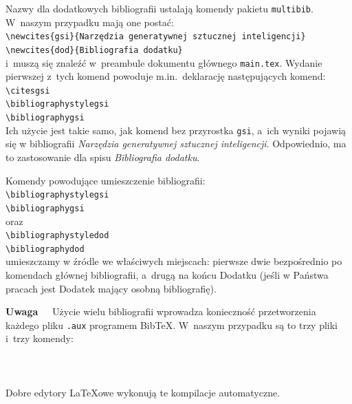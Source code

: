 Nazwy dla dodatkowych bibliografii ustalają komendy pakietu {\tt multibib}. W~naszym przypadku mają one postać:\\[6pt]
\mbox{}\hspace{40pt}\verb+\newcites{gsi}{Narzędzia generatywnej sztucznej inteligencji}+\\  
\mbox{}\hspace{40pt}\verb+\newcites{dod}{Bibliografia dodatku}+\\[6pt]
i~muszą się znaleźć w~preambule dokumentu głównego {\tt main.tex}. Wydanie pierwszej z~tych komend powoduje m.in.\ deklarację następujących komend:\\[6pt]
\mbox{}\hspace{40pt}\verb+\citesgsi+\\  
\mbox{}\hspace{40pt}\verb+\bibliographystylegsi+\\
\mbox{}\hspace{40pt}\verb+\bibliographygsi+\\[6pt]
Ich użycie jest takie samo, jak komend bez przyrostka {\tt gsi}, a~ich wyniki pojawią się w bibliografii {\em Narzędzia generatywnej sztucznej inteligencji}. Odpowiednio, ma to zastosowanie dla spisu {\em Bibliografia dodatku}.

Komendy powodujące umieszczenie bibliografii:\\[6pt]
\mbox{}\hspace{40pt}\verb+\bibliographystylegsi+\\
\mbox{}\hspace{40pt}\verb+\bibliographygsi+\\[6pt]
oraz\\[6pt]
\mbox{}\hspace{40pt}\verb+\bibliographystyledod+\\
\mbox{}\hspace{40pt}\verb+\bibliographydod+\\[6pt]
umieszczamy w źródle we właściwych miejscach: pierwsze dwie bezpośrednio po komendach głównej bibliografii, a~drugą na końcu Dodatku (jeśli w Państwa pracach jest Dodatek mający osobną bibliografię).

{\bf Uwaga~~} Użycie wielu bibliografii wprowadza konieczność przetworzenia każdego pliku {\tt *.aux} programem Bib\TeX. W~naszym przypadku są to trzy pliki i~trzy komendy:\\[6pt]
\mbox{}\hspace{40pt}{\tt > bibtex main.aux}\\  
\mbox{}\hspace{40pt}{\tt > bibtex gsi.aux}\\  
\mbox{}\hspace{40pt}{\tt > bibtex dod.aux}\\[6pt]  
Dobre edytory \LaTeX{}owe wykonują te kompilacje automatyczne.

